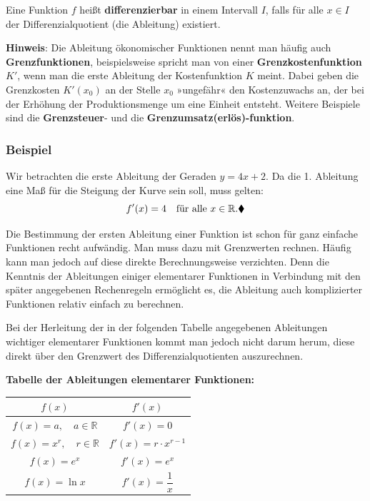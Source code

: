 Eine Funktion $f$ heißt \textbf{differenzierbar} in einem Intervall $I$, falls für alle $x \in I$ der Differenzialquotient (die Ableitung) existiert.

\textbf{Hinweis}: Die Ableitung ökonomischer Funktionen nennt man häufig auch \textbf{Grenzfunktionen}, beispielsweise spricht man von einer \textbf{Grenzkostenfunktion} $K'$, wenn man die erste Ableitung der Kostenfunktion $K$ meint. Dabei geben die Grenzkosten $K'(x_0)$ an der Stelle $x_0$ »ungefähr« den Kostenzuwachs an, der bei der Erhöhung der Produktionsmenge um eine Einheit entsteht. Weitere Beispiele sind die \textbf{Grenzsteuer}- und die \textbf{Grenzumsatz(erlös)-funktion}.

\subsubsection{Beispiel}

Wir betrachten die erste Ableitung der Geraden $y = 4x + 2$. Da die 1. Ableitung eine Maß für die Steigung der Kurve sein soll, muss gelten:
\[ f'(x) = 4 \quad \text{für alle } x \in \mathbb{R} .\beispielende \]

Die Bestimmung der ersten Ableitung einer Funktion ist schon für ganz einfache Funktionen recht aufwändig. Man muss dazu mit Grenzwerten rechnen. Häufig kann man jedoch auf diese direkte Berechnungsweise verzichten. Denn die Kenntnis der Ableitungen einiger elementarer Funktionen in Verbindung mit den später angegebenen Rechenregeln ermöglicht es, die Ableitung auch komplizierter Funktionen relativ einfach zu berechnen.

Bei der Herleitung der in der folgenden Tabelle angegebenen Ableitungen wichtiger elementarer Funktionen kommt man jedoch nicht darum herum, diese direkt über den Grenzwert des Differenzialquotienten auszurechnen.

\textbf{Tabelle der Ableitungen elementarer Funktionen:}
\begin{center}
  \begin{tabular}{cc}
    \hline
    $f(x)$ & $f'(x)$\\
    \hline
    $f(x) = a, \quad a \in \mathbb{R}$ & $f'(x) = 0$\\
    $f(x) = x^r, \quad r \in \mathbb{R}$ & $f'(x) = r \cdot x^{r-1}$\\
    $f(x) = e^x$ & $f'(x) = e^x$\\
    $f(x) = \ln x$ & $f'(x) = \dfrac{1}{x}$\\
    \hline
  \end{tabular}
\end{center}

